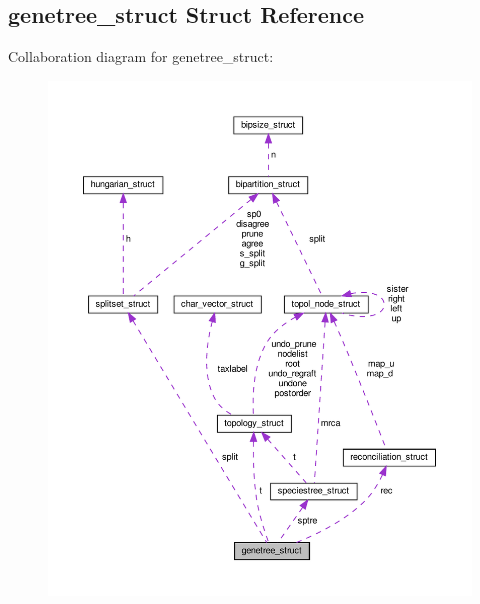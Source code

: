 \hypertarget{structgenetree__struct}{}\subsection{genetree\+\_\+struct Struct Reference}
\label{structgenetree__struct}


Collaboration diagram for genetree\+\_\+struct\+:\nopagebreak
\begin{figure}[H]
\begin{center}
\leavevmode
\includegraphics[width=350pt]{structgenetree__struct__coll__graph}
\end{center}
\end{figure}
